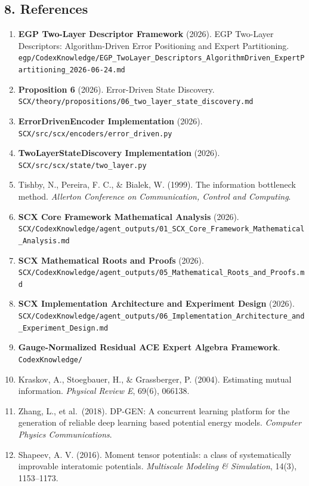 \documentclass[
  12pt,
]{article}
\providecommand{\tightlist}{%
  \setlength{\itemsep}{0pt}\setlength{\parskip}{0pt}}
\begin{document}
\subsection{8. References}\label{references}

\begin{enumerate}
\def\labelenumi{\arabic{enumi}.}
\tightlist
\item
  \textbf{EGP Two-Layer Descriptor Framework} (2026). EGP Two-Layer Descriptors: Algorithm-Driven Error Positioning and Expert Partitioning. \texttt{egp/CodexKnowledge/EGP\_TwoLayer\_Descriptors\_AlgorithmDriven\_ExpertPartitioning\_2026-06-24.md}
\item
  \textbf{Proposition 6} (2026). Error-Driven State Discovery. \texttt{SCX/theory/propositions/06\_two\_layer\_state\_discovery.md}
\item
  \textbf{ErrorDrivenEncoder Implementation} (2026). \texttt{SCX/src/scx/encoders/error\_driven.py}
\item
  \textbf{TwoLayerStateDiscovery Implementation} (2026). \texttt{SCX/src/scx/state/two\_layer.py}
\item
  Tishby, N., Pereira, F. C., \& Bialek, W. (1999). The information bottleneck method. \emph{Allerton Conference on Communication, Control and Computing}.
\item
  \textbf{SCX Core Framework Mathematical Analysis} (2026). \texttt{SCX/CodexKnowledge/agent\_outputs/01\_SCX\_Core\_Framework\_Mathematical\_Analysis.md}
\item
  \textbf{SCX Mathematical Roots and Proofs} (2026). \texttt{SCX/CodexKnowledge/agent\_outputs/05\_Mathematical\_Roots\_and\_Proofs.md}
\item
  \textbf{SCX Implementation Architecture and Experiment Design} (2026). \texttt{SCX/CodexKnowledge/agent\_outputs/06\_Implementation\_Architecture\_and\_Experiment\_Design.md}
\item
  \textbf{Gauge-Normalized Residual ACE Expert Algebra Framework}. \texttt{CodexKnowledge/}
\item
  Kraskov, A., Stoegbauer, H., \& Grassberger, P. (2004). Estimating mutual information. \emph{Physical Review E}, 69(6), 066138.
\item
  Zhang, L., et al.~(2018). DP-GEN: A concurrent learning platform for the generation of reliable deep learning based potential energy models. \emph{Computer Physics Communications}.
\item
  Shapeev, A. V. (2016). Moment tensor potentials: a class of systematically improvable interatomic potentials. \emph{Multiscale Modeling \& Simulation}, 14(3), 1153--1173.
\end{enumerate}
\end{document}
